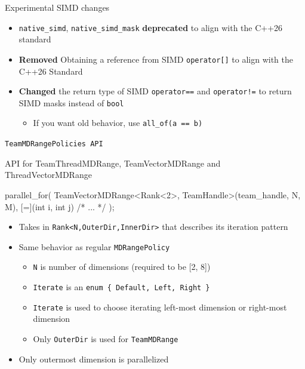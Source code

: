 \begin{frame}[fragile]{Experimental SIMD changes}
  \begin{itemize}
    \item \texttt{native\_simd}, \texttt{native\_simd\_mask} \textbf{deprecated} to align with the C++26 standard
    \item \textbf{Removed} Obtaining a reference from SIMD \texttt{operator[]} to align with the C++26 Standard
    \item \textbf{Changed} the return type of SIMD \texttt{operator==} and \texttt{operator!=} to return SIMD masks instead of \texttt{bool}
    \begin{itemize}
      \item If you want old behavior, use \texttt{all\_of(a == b)}
    \end{itemize}
  \end{itemize}
\end{frame}

\begin{frame}[fragile]{\texttt{TeamMDRangePolicies API}}

API for TeamThreadMDRange, TeamVectorMDRange and ThreadVectorMDRange

\vspace{10pt}

\begin{code}[keywords={TeamVectorMDRange}]
 parallel_for(
   TeamVectorMDRange<Rank<2>, TeamHandle>(team_handle, N, M),
   [=](int i, int j) { /* ... */ }
 );
\end{code}

\vspace{10pt}

\begin{itemize}
  \item Takes in \texttt{Rank<N,OuterDir,InnerDir>} that describes its iteration pattern
  \item Same behavior as regular \texttt{MDRangePolicy}
  \begin{itemize}
    \item \texttt{N} is number of dimensions (required to be [2, 8])
    \item \texttt{Iterate} is an \texttt{enum \{ Default, Left, Right \}}
    \item \texttt{Iterate} is used to choose iterating left-most dimension or right-most dimension
    \item Only \texttt{OuterDir} is used for \texttt{TeamMDRange}
  \end{itemize}
  \item Only outermost dimension is parallelized
\end{itemize}
\end{frame}

